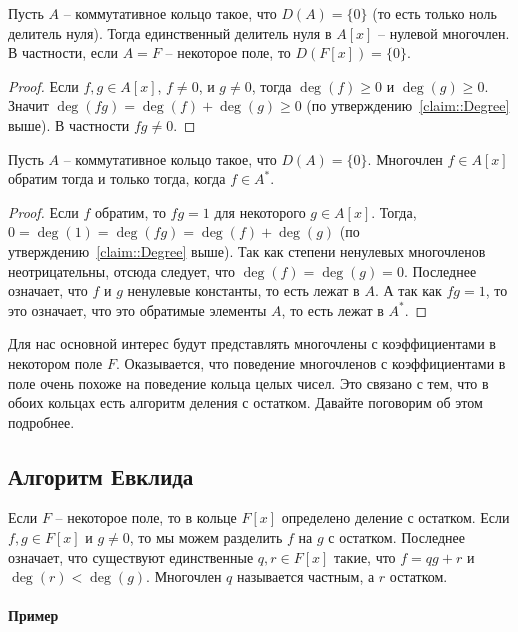 \begin{claim}
\label{claim::PolyZeroDiv}
Пусть $A$ -- коммутативное кольцо такое, что $D(A) = \{0\}$ (то есть только ноль делитель нуля).
Тогда единственный делитель нуля в $A[x]$ -- нулевой многочлен.
В частности, если $A = F$ -- некоторое поле, то $D(F[x]) = \{0\}$.
\end{claim}
\begin{proof}
Если $f, g\in A[x]$, $f\neq 0$, и $g\neq 0$, тогда $\deg(f) \geqslant 0$ и $\deg(g) \geqslant 0$.
Значит $\deg(fg) = \deg(f) + \deg(g)\geqslant 0$ (по утверждению~\ref{claim::Degree} выше).
В частности $fg \neq 0$.
\end{proof}

\begin{claim}
\label{claim::PolyInvert}
Пусть $A$ -- коммутативное кольцо такое, что $D(A) = \{0\}$.
Многочлен $f\in A[x]$ обратим тогда и только тогда, когда $f\in A^*$.
\end{claim}
\begin{proof}
Если $f$ обратим, то $fg = 1$ для некоторого $g\in A[x]$.
Тогда, $0 = \deg(1) = \deg(fg) = \deg(f) + \deg(g)$ (по утверждению~\ref{claim::Degree} выше).
Так как степени ненулевых многочленов неотрицательны, отсюда следует, что $\deg(f) = \deg(g) = 0$.
Последнее означает, что $f$ и $g$ ненулевые константы, то есть лежат в $A$.
А так как $fg = 1$, то это означает, что это обратимые элементы $A$, то есть лежат в $A^*$.
\end{proof}

Для нас основной интерес будут представлять многочлены с коэффициентами в некотором поле $F$.
Оказывается, что поведение многочленов с коэффициентами в поле очень похоже на поведение кольца целых чисел.
Это связано с тем, что в обоих кольцах есть алгоритм деления с остатком.
Давайте поговорим об этом подробнее.

\subsection{Алгоритм Евклида}

Если $F$ -- некоторое поле, то в кольце $F[x]$ определено деление с остатком.
Если $f, g \in F[x]$ и $g\neq 0$, то мы можем разделить $f$ на $g$ с остатком.
Последнее означает, что существуют единственные $q, r\in F[x]$ такие, что $f = q g + r$ и $\deg(r) < \deg (g)$.
Многочлен $q$ называется частным, а $r$ остатком.

\paragraph{Пример}


